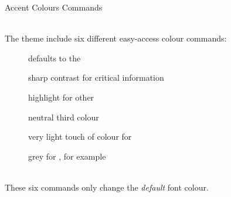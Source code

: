 \documentclass[aspectratio=169,12pt]{beamer}
\begin{document}
\begin{frame}{Accent Colours Commands }

  \\
  The  theme include \alert{six} different easy-access colour commands:

  \smallskip
  \begin{description}
  \item[] defaults to the 
  \item[] sharp contrast for \alert{critical information}
  \item[] highlight for other 
  \item[] neutral third colour 
  \item[] very light touch of colour for 
  \item[] grey for , for example
  \end{description}

  \medskip
  \\
  These six commands only change the \emph{default} font colour.
\end{frame}
\end{document}
